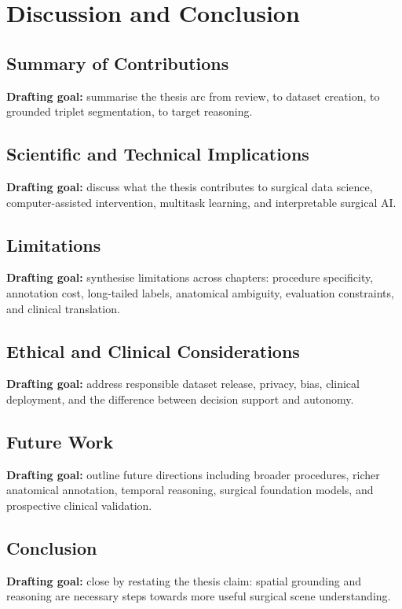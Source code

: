 \chapter{Discussion and Conclusion}
\label{chap:discussion-conclusion}
\minitoc

\section{Summary of Contributions}
\label{sec:discussion-summary}

\textbf{Drafting goal:} summarise the thesis arc from review, to dataset creation, to grounded triplet segmentation, to target reasoning.

\section{Scientific and Technical Implications}
\label{sec:discussion-implications}

\textbf{Drafting goal:} discuss what the thesis contributes to surgical data science, computer-assisted intervention, multitask learning, and interpretable surgical AI.

\section{Limitations}
\label{sec:discussion-limitations}

\textbf{Drafting goal:} synthesise limitations across chapters: procedure specificity, annotation cost, long-tailed labels, anatomical ambiguity, evaluation constraints, and clinical translation.

\section{Ethical and Clinical Considerations}
\label{sec:discussion-ethics}

\textbf{Drafting goal:} address responsible dataset release, privacy, bias, clinical deployment, and the difference between decision support and autonomy.

\section{Future Work}
\label{sec:discussion-future-work}

\textbf{Drafting goal:} outline future directions including broader procedures, richer anatomical annotation, temporal reasoning, surgical foundation models, and prospective clinical validation.

\section{Conclusion}
\label{sec:discussion-conclusion}

\textbf{Drafting goal:} close by restating the thesis claim: spatial grounding and reasoning are necessary steps towards more useful surgical scene understanding.
